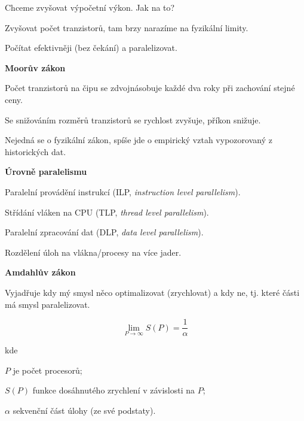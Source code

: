 \begin{compactitem}
    \item Chceme zvyšovat výpočetní výkon. Jak na to? \begin{compactitem}
        \item Zvyšovat počet tranzistorů, tam brzy narazíme na fyzikální limity.
        \item Počítat efektivněji (bez čekání) a paralelizovat.
    \end{compactitem}

    \item \textbf{Moorův zákon} \begin{compactitem}
        \item Počet tranzistorů na čipu se zdvojnásobuje každé dva roky při zachování stejné ceny.
        \item Se snižováním rozměrů tranzistorů se rychlost zvyšuje, příkon snižuje.
        \item Nejedná se o fyzikální zákon, spíše jde o empirický vztah vypozorovaný z historických dat.
    \end{compactitem}

    \item \textbf{Úrovně paralelismu} \begin{compactitem}
        \item Paralelní provádění instrukcí (ILP, \textit{instruction level parallelism}).
        \item Střídání vláken na CPU (TLP, \textit{thread level parallelism}).
        \item Paralelní zpracování dat (DLP, \textit{data level parallelism}).
        \item Rozdělení úloh na vlákna/procesy na více jader.
    \end{compactitem}

    \item \textbf{Amdahlův zákon} \begin{compactitem}
        \item Vyjadřuje kdy mý smysl něco optimalizovat (zrychlovat) a kdy ne, tj. které části má smysl paralelizovat.

        $$ \lim_{P \rightarrow \infty}{S(P)} = \frac{1}{\alpha} $$
        \item kde \begin{compactitem}
            \item $P$ je počet procesorů;
            \item $S(P)$ funkce dosáhnutého zrychlení v závislosti na $P$;
            \item $\alpha$ sekvenční část úlohy (ze své podstaty).
        \end{compactitem}


\end{compactitem}
\end{compactitem}
